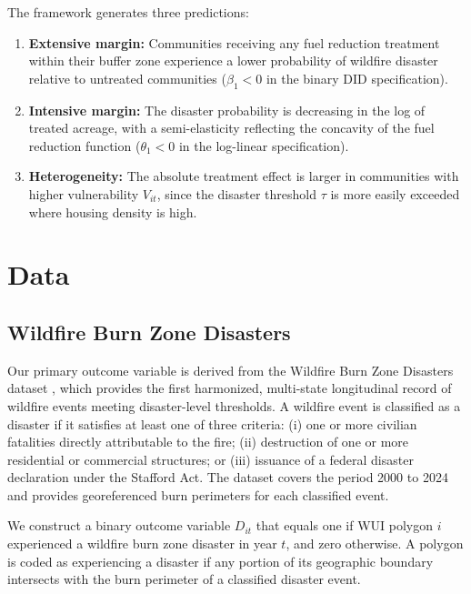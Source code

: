 \documentclass[12pt, letterpaper]{article}
\begin{document}
The framework generates three predictions:

\begin{enumerate}[label=\textbf{P\arabic*.}]
    \item \textbf{Extensive margin:} Communities receiving any fuel reduction treatment within their buffer zone experience a lower probability of wildfire disaster relative to untreated communities ($\beta_1 < 0$ in the binary DID specification).
    \item \textbf{Intensive margin:} The disaster probability is decreasing in the log of treated acreage, with a semi-elasticity reflecting the concavity of the fuel reduction function ($\theta_1 < 0$ in the log-linear specification).
    \item \textbf{Heterogeneity:} The absolute treatment effect is larger in communities with higher vulnerability $V_{it}$, since the disaster threshold $\tau$ is more easily exceeded where housing density is high.
\end{enumerate}


\section{Data}

\subsection{Wildfire Burn Zone Disasters}

Our primary outcome variable is derived from the Wildfire Burn Zone Disasters dataset \citep{wilner2025}, which provides the first harmonized, multi-state longitudinal record of wildfire events meeting disaster-level thresholds. A wildfire event is classified as a disaster if it satisfies at least one of three criteria: (i) one or more civilian fatalities directly attributable to the fire; (ii) destruction of one or more residential or commercial structures; or (iii) issuance of a federal disaster declaration under the Stafford Act. The dataset covers the period 2000 to 2024 and provides georeferenced burn perimeters for each classified event.

We construct a binary outcome variable $D_{it}$ that equals one if WUI polygon $i$ experienced a wildfire burn zone disaster in year $t$, and zero otherwise. A polygon is coded as experiencing a disaster if any portion of its geographic boundary intersects with the burn perimeter of a classified disaster event.
\end{document}
